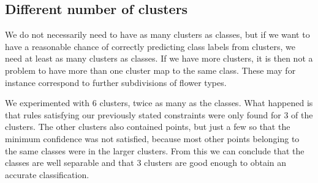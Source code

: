 \documentclass[]{article}
\begin{document}
\subsection{Different number of clusters}
We do not necessarily need to have as many clusters as classes, but if we want to have a reasonable chance of correctly predicting class labels from clusters, we need at least as many clusters as classes. If we have more clusters, it is then not a problem to have more than one cluster map to the same class. These may for instance correspond to further subdivisions of flower types. 

We experimented with 6 clusters, twice as many as the classes. What happened is that rules satisfying our previously stated constraints were only found for 3 of the clusters. The other clusters also contained points, but just a few so that the minimum confidence was not satisfied, because most other points belonging to the same classes were in the larger clusters. From this we can conclude that the classes are well separable and that 3 clusters are good enough to obtain an accurate classification.
\end{document}
